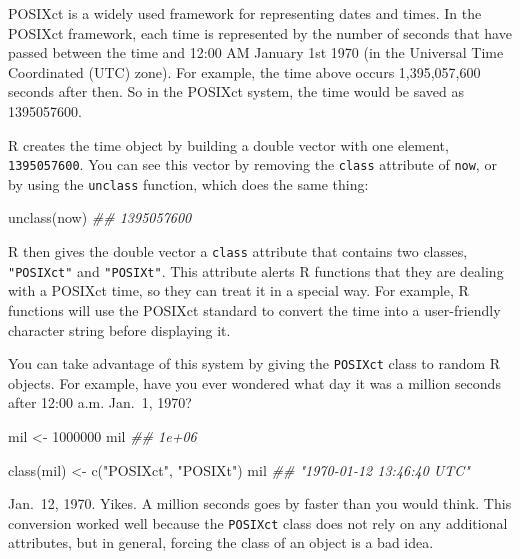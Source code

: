 \documentclass[
  letterpaper,
  DIV=11,
  numbers=noendperiod]{scrbook}
\newenvironment{Shaded}{\begin{snugshade}}{\end{snugshade}}
\newcommand{\DecValTok}[1]{\textcolor[rgb]{0.68,0.00,0.00}{#1}}
\newcommand{\DocumentationTok}[1]{\textcolor[rgb]{0.37,0.37,0.37}{\textit{#1}}}
\newcommand{\FunctionTok}[1]{\textcolor[rgb]{0.28,0.35,0.67}{#1}}
\newcommand{\NormalTok}[1]{\textcolor[rgb]{0.00,0.23,0.31}{#1}}
\newcommand{\OtherTok}[1]{\textcolor[rgb]{0.00,0.23,0.31}{#1}}
\newcommand{\StringTok}[1]{\textcolor[rgb]{0.13,0.47,0.30}{#1}}
\begin{document}
POSIXct is a widely used framework for representing dates and times. In
the POSIXct framework, each time is represented by the number of seconds
that have passed between the time and 12:00 AM January 1st 1970 (in the
Universal Time Coordinated (UTC) zone). For example, the time above
occurs 1,395,057,600 seconds after then. So in the POSIXct system, the
time would be saved as 1395057600.

R creates the time object by building a double vector with one element,
\texttt{1395057600}. You can see this vector by removing the
\texttt{class} attribute of \texttt{now}, or by using the
\texttt{unclass} function, which does the same thing:

\begin{Shaded}
\begin{Highlighting}[]
\FunctionTok{unclass}\NormalTok{(now)}
\DocumentationTok{\#\# 1395057600}
\end{Highlighting}
\end{Shaded}

R then gives the double vector a \texttt{class} attribute that contains
two classes, \texttt{"POSIXct"} and \texttt{"POSIXt"}. This attribute
alerts R functions that they are dealing with a POSIXct time, so they
can treat it in a special way. For example, R functions will use the
POSIXct standard to convert the time into a user-friendly character
string before displaying it.

You can take advantage of this system by giving the \texttt{POSIXct}
class to random R objects. For example, have you ever wondered what day
it was a million seconds after 12:00 a.m. Jan.~1, 1970?

\begin{Shaded}
\begin{Highlighting}[]
\NormalTok{mil }\OtherTok{\textless{}{-}} \DecValTok{1000000}
\NormalTok{mil}
\DocumentationTok{\#\# 1e+06}
 
\FunctionTok{class}\NormalTok{(mil) }\OtherTok{\textless{}{-}} \FunctionTok{c}\NormalTok{(}\StringTok{"POSIXct"}\NormalTok{, }\StringTok{"POSIXt"}\NormalTok{)}
\NormalTok{mil}
\DocumentationTok{\#\# "1970{-}01{-}12 13:46:40 UTC"}
\end{Highlighting}
\end{Shaded}

Jan.~12, 1970. Yikes. A million seconds goes by faster than you would
think. This conversion worked well because the \texttt{POSIXct} class
does not rely on any additional attributes, but in general, forcing the
class of an object is a bad idea.
\end{document}
